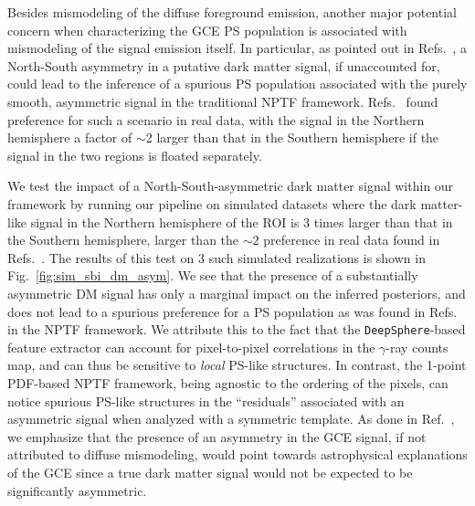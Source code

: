 \documentclass[prd,aps,10pt,nofootinbib,twocolumn,superscriptaddress,preprintnumbers,balancelastpage,longbibliography]{revtex4-1}
\begin{document}
Besides mismodeling of the diffuse foreground emission, another major potential concern when characterizing the GCE PS population is associated with mismodeling of the signal emission itself. In particular, as pointed out in Refs.~\cite{Leane:2020nmi,Leane:2020pfc}, a North-South asymmetry in a putative dark matter signal, if unaccounted for, could lead to the inference of a spurious PS population associated with the purely smooth, asymmetric signal in the traditional NPTF framework. Refs.~\cite{Leane:2020nmi,Leane:2020pfc} found preference for such a scenario in real \Fermi data, with the signal in the Northern hemisphere a factor of $\sim$2 larger than that in the Southern hemisphere if the signal in the two regions is floated separately. 

We test the impact of a North-South-asymmetric dark matter signal within our framework by running our pipeline on simulated datasets where the dark matter-like signal in the Northern hemisphere of the ROI is 3 times larger than that in the Southern hemisphere, larger than the $\sim 2$ preference in real data found in Refs.~\cite{Leane:2020nmi,Leane:2020pfc}. The results of this test on 3 such simulated realizations is shown in Fig.~\ref{fig:sim_sbi_dm_asym}. We see that the presence of a substantially asymmetric DM signal has only a marginal impact on the inferred posteriors, and does not lead to a spurious preference for a PS population as was found in Refs.~\cite{Leane:2020nmi,Leane:2020pfc} in the NPTF framework. We attribute this to the fact that the \texttt{DeepSphere}-based feature extractor can account for pixel-to-pixel correlations in the $\gamma$-ray counts map, and can thus be sensitive to \emph{local} PS-like structures. In contrast, the 1-point PDF-based NPTF framework, being agnostic to the ordering of the pixels, can notice spurious PS-like structures in the ``residuals'' associated with an asymmetric signal when analyzed with a symmetric template.
As done in Ref.~\cite{Buschmann:2020adf}, we emphasize that the presence of an asymmetry in the GCE signal, if not attributed to diffuse mismodeling, would point towards astrophysical explanations of the GCE since a true dark matter signal would not be expected to be significantly asymmetric.

\end{document}
